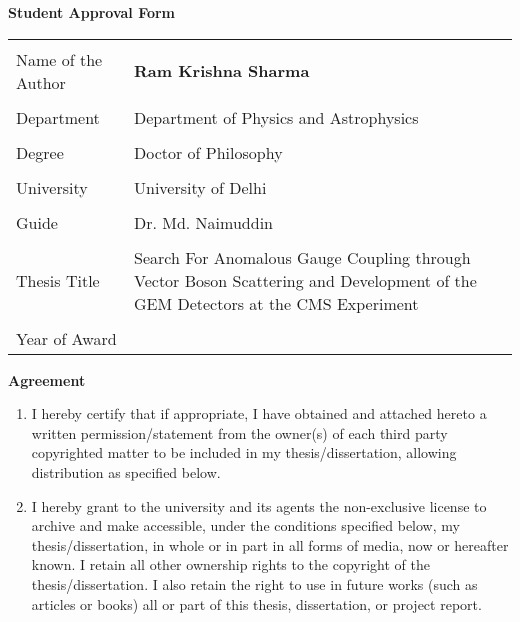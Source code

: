 \begin{center}
\textbf{\LARGE Student Approval Form}
\end{center}
\vspace{1cm}
%
%
%
\begin{tabular}{|l|p{12cm}|} \hline
 & \\ [-1em]
Name of the Author & {\bf Ram Krishna Sharma}\\ \hline
 & \\ [-1em]
Department & Department of Physics and Astrophysics\\ \hline
 & \\ [-1em]
Degree &  Doctor of Philosophy \\ \hline
 & \\ [-1em]
University & University of Delhi \\ \hline
 & \\ [-1em]
Guide & Dr. Md. Naimuddin \\ \hline
 & \\ [-1em]
Thesis Title & Search For Anomalous Gauge Coupling through Vector Boson Scattering and Development of the GEM Detectors at the CMS Experiment\\ \hline
 & \\ [-1em]
Year of Award & \\ \hline
\end{tabular}
%
%
%
\vspace{0.5cm}
%
%
%
\begin{center}
\textbf{Agreement} \\
\end{center}
\vspace{0.5cm}
\begin{enumerate}
\item I hereby certify that if appropriate, I have obtained and attached hereto a written permission/statement from the owner(s) of each third party copyrighted matter to be included in my thesis/dissertation, allowing distribution as specified below.
\item I hereby grant to the university and its agents the non-exclusive license to archive and make accessible, under the conditions specified below, my thesis/dissertation, in whole or in part in all forms of media, now or hereafter known. I retain all other ownership rights to the copyright of the thesis/dissertation. I also retain the right to use in future works (such as articles or books) all or part of this thesis, dissertation, or project report.
\end{enumerate}

